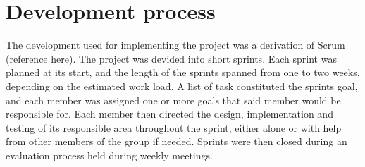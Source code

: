 \section{Development process}

The development used for implementing the project was a derivation of Scrum (reference here).
The project was devided into short sprints. Each sprint was planned at its start, and the
length of the sprints spanned from one to two weeks, depending on the estimated work load.
A list of task constituted the sprints goal, and each member was assigned one or more goals
that said member would be responsible for. Each member then directed the design,
implementation and testing of its responsible area throughout the sprint, either alone or
with help from other members of the group if needed. Sprints were then closed during an
evaluation process held during weekly meetings.
